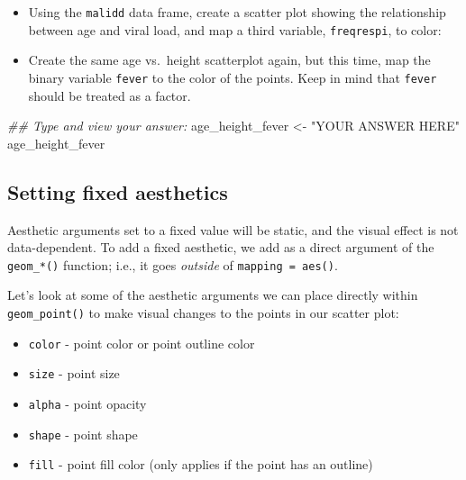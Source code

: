 \documentclass[
  letterpaper,
  DIV=11,
  numbers=noendperiod]{scrreprt}
\newenvironment{Shaded}{\begin{snugshade}}{\end{snugshade}}
\newcommand{\DocumentationTok}[1]{\textcolor[rgb]{0.37,0.37,0.37}{\textit{#1}}}
\newcommand{\NormalTok}[1]{\textcolor[rgb]{0.00,0.23,0.31}{#1}}
\newcommand{\OtherTok}[1]{\textcolor[rgb]{0.00,0.23,0.31}{#1}}
\newcommand{\StringTok}[1]{\textcolor[rgb]{0.13,0.47,0.30}{#1}}
\begin{document}
\begin{tcolorbox}[enhanced jigsaw, colframe=quarto-callout-tip-color-frame, rightrule=.15mm, opacityback=0, breakable, coltitle=black, colbacktitle=quarto-callout-tip-color!10!white, bottomrule=.15mm, leftrule=.75mm, toprule=.15mm, arc=.35mm, bottomtitle=1mm, colback=white, left=2mm, opacitybacktitle=0.6, titlerule=0mm, title=\textcolor{quarto-callout-tip-color}{\faLightbulb}\hspace{0.5em}{Practice}, toptitle=1mm]

\begin{itemize}
\item
  Using the \texttt{malidd} data frame, create a scatter plot showing
  the relationship between age and viral load, and map a third variable,
  \texttt{freqrespi}, to color:
\item
  Create the same age vs.~height scatterplot again, but this time, map
  the binary variable \texttt{fever} to the color of the points. Keep in
  mind that \texttt{fever} should be treated as a factor.
\end{itemize}

\begin{Shaded}
\begin{Highlighting}[]
\DocumentationTok{\#\# Type and view your answer:}
\NormalTok{age\_height\_fever }\OtherTok{\textless{}{-}}  \StringTok{"YOUR ANSWER HERE"}
\NormalTok{age\_height\_fever}
\end{Highlighting}
\end{Shaded}

\end{tcolorbox}

\hypertarget{setting-fixed-aesthetics}{%
\subsection{Setting fixed aesthetics}\label{setting-fixed-aesthetics}}

Aesthetic arguments set to a fixed value will be static, and the visual
effect is not data-dependent. To add a fixed aesthetic, we add as a
direct argument of the \texttt{geom\_*()} function; i.e., it goes
\emph{outside} of \texttt{mapping\ =\ aes()}.

Let's look at some of the aesthetic arguments we can place directly
within \texttt{geom\_point()} to make visual changes to the points in
our scatter plot:

\begin{itemize}
\item
  \texttt{color} - point color or point outline color
\item
  \texttt{size} - point size
\item
  \texttt{alpha} - point opacity
\item
  \texttt{shape} - point shape
\item
  \texttt{fill} - point fill color (only applies if the point has an
  outline)
\end{itemize}
\end{document}
